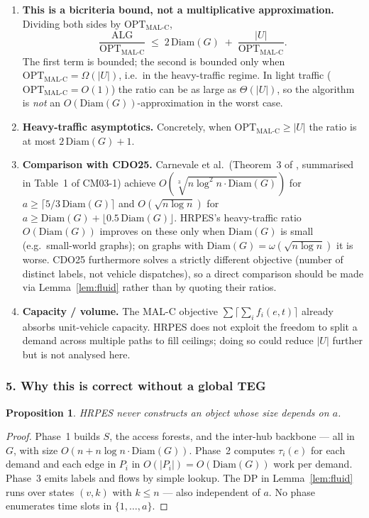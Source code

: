 \documentclass[12pt, a4paper]{article}
\newtheorem{proposition}{Proposition}
\begin{document}
\begin{enumerate}[noitemsep,leftmargin=*]
  \item \textbf{This is a bicriteria bound, not a multiplicative approximation.}
  Dividing both sides by $\mathrm{OPT}_\mathrm{MAL\text{-}C}$,
  \[
    \frac{\mathrm{ALG}}{\mathrm{OPT}_\mathrm{MAL\text{-}C}} \;\le\; 2\,\mathrm{Diam}(G) \;+\; \frac{|U|}{\mathrm{OPT}_\mathrm{MAL\text{-}C}}.
  \]
  The first term is bounded; the second is bounded only when $\mathrm{OPT}_\mathrm{MAL\text{-}C}=\Omega(|U|)$, i.e.\ in the heavy-traffic regime. In light traffic ($\mathrm{OPT}_\mathrm{MAL\text{-}C}=O(1)$) the ratio can be as large as $\Theta(|U|)$, so the algorithm is \emph{not} an $O(\mathrm{Diam}(G))$-approximation in the worst case.
  \item \textbf{Heavy-traffic asymptotics.}
  Concretely, when $\mathrm{OPT}_\mathrm{MAL\text{-}C}\ge|U|$ the ratio is at most $2\,\mathrm{Diam}(G)+1$.
  \item \textbf{Comparison with CDO25.}
  Carnevale et al.\ (Theorem~3 of \cite{CDO25}, summarised in Table~1 of CM03-1) achieve $O(\sqrt[3]{n\log^2 n\cdot\mathrm{Diam}(G)})$ for $a\ge\lceil 5/3\,\mathrm{Diam}(G)\rceil$ and $O(\sqrt{n\log n})$ for $a\ge\mathrm{Diam}(G)+\lfloor 0.5\,\mathrm{Diam}(G)\rfloor$. HRPES's heavy-traffic ratio $O(\mathrm{Diam}(G))$ improves on these only when $\mathrm{Diam}(G)$ is small (e.g.\ small-world graphs); on graphs with $\mathrm{Diam}(G)=\omega(\sqrt{n\log n})$ it is worse. CDO25 furthermore solves a strictly different objective (number of distinct labels, not vehicle dispatches), so a direct comparison should be made via Lemma~\ref{lem:fluid} rather than by quoting their ratios.
  \item \textbf{Capacity / volume.}
  The MAL-C objective $\sum\lceil\sum_i f_i(e,t)\rceil$ already absorbs unit-vehicle capacity. HRPES does not exploit the freedom to split a demand across multiple paths to fill ceilings; doing so could reduce $|U|$ further but is not analysed here.
\end{enumerate}

\subsubsection*{5. Why this is correct without a global TEG}

\begin{proposition}
HRPES never constructs an object whose size depends on $a$.
\end{proposition}
\begin{proof}
Phase~1 builds $S$, the access forests, and the inter-hub backbone — all in $G$, with size $O(n+n\log n\cdot\mathrm{Diam}(G))$. Phase~2 computes $\tau_i(e)$ for each demand and each edge in $P_i$ in $O(|P_i|)=O(\mathrm{Diam}(G))$ work per demand. Phase~3 emits labels and flows by simple lookup. The DP in Lemma~\ref{lem:fluid} runs over states $(v,k)$ with $k\le n$ — also independent of $a$. No phase enumerates time slots in $\{1,\dots,a\}$.
\end{proof}
\end{document}
